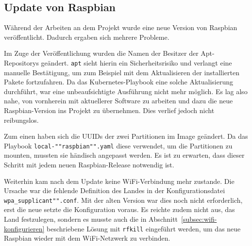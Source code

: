 \subsection{Update von Raspbian}

Während der Arbeiten an dem Projekt wurde eine neue Version von Raspbian veröffentlicht.
Dadurch ergaben sich mehrere Probleme.

Im Zuge der Veröffentlichung wurden die Namen der Besitzer der Apt-Repositorys geändert.
\texttt{apt} sieht hierin ein Sicherheitsrisiko und verlangt eine manuelle Bestätigung, um zum Beispiel mit dem Aktualisieren der installierten Pakete fortzufahren.
Da das Kubernetes-Playbook eine solche Aktualisierung durchführt, war eine unbeaufsichtigte Ausführung nicht mehr möglich.
Es lag also nahe, von vornherein mit aktuellerer Software zu arbeiten und dazu die neue Raspbian-Version ins Projekt zu übernehmen.
Dies verlief jedoch nicht reibungslos.

Zum einen haben sich die UUIDs der zwei Partitionen im Image geändert.
Da das Playbook \texttt{local-""raspbian"".yaml} diese verwendet, um die Partitionen zu mounten, mussten sie händisch angepasst werden.
Es ist zu erwarten, dass dieser Schritt mit jedem neuen Raspbian-Release notwendig ist.

Weiterhin kam nach dem Update keine WiFi-Verbindung mehr zustande.
Die Ursache war die fehlende Definition des Landes in der Konfigurationsdatei \texttt{wpa\_supplicant"".conf}.
Mit der alten Version war dies noch nicht erforderlich, erst die neue setzte die Konfiguration voraus.
Es reichte zudem nicht aus, das Land festzulegen, sondern es musste auch die in Abschnitt~\ref{subsec:wifi-konfigurieren} beschriebene Lösung mit \texttt{rfkill} eingeführt werden, um das neue Raspbian wieder mit dem WiFi-Netzwerk zu verbinden.
